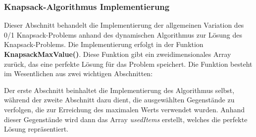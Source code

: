 \subsubsection{Knapsack-Algorithmus Implementierung}
Dieser Abschnitt behandelt die Implementierung der allgemeinen Variation des 0/1 Knapsack-Problems anhand des dynamischen
Algorithmus zur Lösung des Knapsack-Problems. Die Implementierung erfolgt in der Funktion \textbf{KnapsackMaxValue()}.
Diese Funktion gibt ein zweidimensionales Array zurück, das eine perfekte Lösung für das Problem speichert. Die Funktion
besteht im Wesentlichen aus zwei wichtigen Abschnitten:

Der erste Abschnitt beinhaltet die Implementierung des Algorithmus selbst, während der zweite Abschnitt dazu dient, die
ausgewählten Gegenstände zu verfolgen, die zur Erreichung des maximalen Werts verwendet wurden. Anhand dieser Gegenstände
wird dann das Array \textit{usedItems} erstellt, welches die perfekte Lösung repräsentiert.


